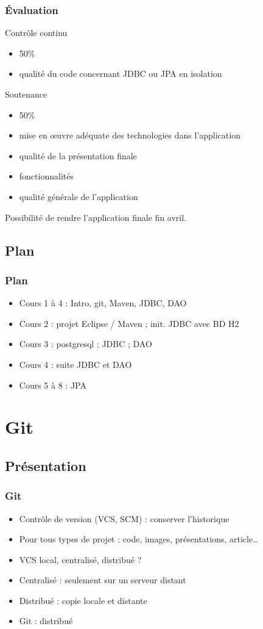 \documentclass[english, french]{beamer}
\begin{document}
\begin{frame}
	\frametitle{Évaluation}
	\begin{block}{Contrôle continu}
		\begin{itemize}
			\item 50\%
			\item qualité du code concernant JDBC ou JPA en isolation
		\end{itemize}
	\end{block}
	\begin{block}{Soutenance}
		\begin{itemize}
			\item 50\%
			\item mise en œuvre adéquate des technologies dans l’application
			\item qualité de la présentation finale
			\item fonctionnalités
			\item qualité générale de l’application
		\end{itemize}
	\end{block}
	Possibilité de rendre l’application finale fin avril.
\end{frame}

\subsection{Plan}
\begin{frame}
	\frametitle{Plan}
	\begin{itemize}
		\item Cours 1 à 4 : Intro, git, Maven, JDBC, DAO
		\item Cours 2 : projet Eclipse / Maven ; init. JDBC avec BD H2
		\item Cours 3 : postgresql ; JDBC ; DAO
		\item Cours 4 : suite JDBC et DAO
		\item Cours 5 à 8 : JPA
	\end{itemize}
\end{frame}

\section{Git}
\subsection{Présentation}
\begin{frame}
	\frametitle{Git}
	\begin{itemize}
		\item Contrôle de version (VCS, SCM) : conserver l’historique
		\item Pour tous types de projet : code, images, présentations, article…
		\item VCS local, centralisé, distribué ? \pause
		\item Centralisé : seulement sur un serveur distant
		\item Distribué : copie locale et distante
		\item Git : distribué
	\end{itemize}
\end{frame}
\end{document}
